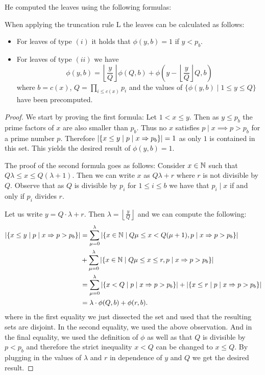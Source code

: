 He computed the leaves using the following formulas:
\begin{lemma}
	When applying the truncation rule L the leaves can be calculated as follows:
	\begin{itemize}
		\item For leaves of type $(i)$ it holds that $\phi(y,b) = 1$ if $y < p_{b}$.
		\item For leaves of type $(ii)$ we have
			\[
				\phi(y,b) = \left\lfloor \frac{y}{Q} \right\rfloor \phi(Q,b) + \phi(y-\left\lfloor \frac{y}{Q} \right\rfloor Q,b)
			\] 
			where $b = c( x)$, $Q = \prod_{i \leq c(x)} p_{i}$ and the values of $\{\phi(y,b) \mid 1 \leq y \leq Q\} $ have been precomputed.
	\end{itemize}
\end{lemma}

\begin{proof}
	We start by proving the first formula:
	Let $1 < x \leq y$. Then as $y \leq p_{b}$ the prime factors of $x$ are also smaller than $p_{b}$.
	Thus no $x$ satisfies $p \mid x \implies p > p_{b}$ for a prime number $p$. Therefore
	$\abs{\{x \leq y \mid p\mid x \Rightarrow p_{b}\} } = 1$ as only $1$ is contained in this set.
	This yields the desired result of $\phi(y,b) = 1$.

	The proof of the second formula goes as follows:
	Consider $x \in \mathbb{N}$ such that $Q \lambda \leq x \leq Q (\lambda+1)$. Then we can write $x$ as
	$Q \lambda + r$ where $r$ is not divisible by $Q$.
	Observe that as $Q$ is divisible by $p_{i}$ for $1 \leq i \leq b$ we have that $p_{i} \mid x$ if and only if
	$p_{i}$ divides $r$. 

	Let us write $y = Q \cdot \lambda + r$. Then $\lambda = \left\lfloor \frac{y}{Q} \right\rfloor $ and we can compute the following:
	\begin{align*}
		\abs{\{x \leq y \mid p\mid x \Rightarrow p > p_{b}\}} &= \sum_{\mu=0}^{\lambda} \abs{\{x \in \mathbb{N} \mid Q\mu \leq x < Q(\mu+1), p \mid x \Rightarrow p > p_{b}\}}\\ 
		&+ \sum_{\mu = 0}^{\lambda} \abs{\{x \in \mathbb{N} \mid Q\mu \leq x \leq r, p \mid x \Rightarrow p > p_{b}\}} \\
		&= \sum_{\mu = 0}^{\lambda} \abs{\{x < Q \mid p \mid x \Rightarrow p > p_{b}\}} + \abs{\{x \leq r \mid p \mid x \Rightarrow p > p_{b}\} }\\
		&=  \lambda \cdot \phi(Q,b) + \phi(r,b)
	.\end{align*}
	where in the first equality we just dissected the set and used that the resulting sets are disjoint.
	In the second equality, we used the above observation. And in the final equality, we used the definition of $\phi$ as well as that $Q$ is divisible by $p < p_{b}$
	and therefore the strict inequality $x < Q$ can be changed to $x \leq Q$.
	By plugging in the values of $\lambda$ and $r$ in dependence of $y$ and $Q$ we get the desired result.
\end{proof}


